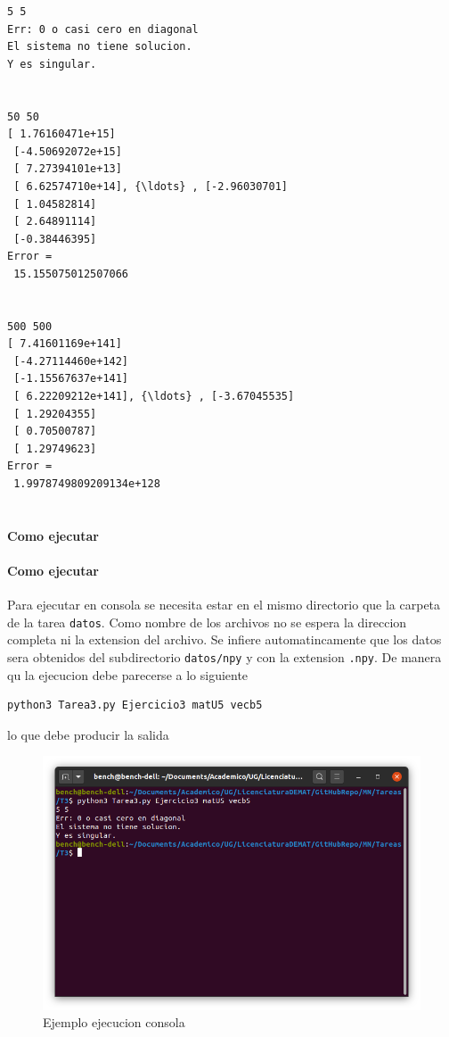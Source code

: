 \documentclass[11pt]{article}
\begin{document}
    \begin{Verbatim}[commandchars=\\\{\}]
5 5
Err: 0 o casi cero en diagonal
El sistema no tiene solucion.
Y es singular.


50 50
[ 1.76160471e+15]
 [-4.50692072e+15]
 [ 7.27394101e+13]
 [ 6.62574710e+14], {\ldots} , [-2.96030701]
 [ 1.04582814]
 [ 2.64891114]
 [-0.38446395]
Error =
 15.155075012507066


500 500
[ 7.41601169e+141]
 [-4.27114460e+142]
 [-1.15567637e+141]
 [ 6.22209212e+141], {\ldots} , [-3.67045535]
 [ 1.29204355]
 [ 0.70500787]
 [ 1.29749623]
Error =
 1.9978749809209134e+128


    \end{Verbatim}

    \hypertarget{como-ejecutar}{%
\paragraph{Como ejecutar}\label{como-ejecutar}}

\hypertarget{como-ejecutar-1}{%
\paragraph{Como ejecutar}\label{como-ejecutar-1}}

Para ejecutar en consola se necesita estar en el mismo directorio que la
carpeta de la tarea \texttt{datos}. Como nombre de los archivos no se
espera la direccion completa ni la extension del archivo. Se infiere
automatincamente que los datos sera obtenidos del subdirectorio
\texttt{datos/npy} y con la extension \texttt{.npy}. De manera qu la
ejecucion debe parecerse a lo siguiente

\begin{verbatim}
python3 Tarea3.py Ejercicio3 matU5 vecb5
\end{verbatim}

lo que debe producir la salida

\begin{figure}
\centering
\includegraphics{assets/T3-E3.png}
\caption{Ejemplo ejecucion consola}
\end{figure}


    
    
    
\end{document}
